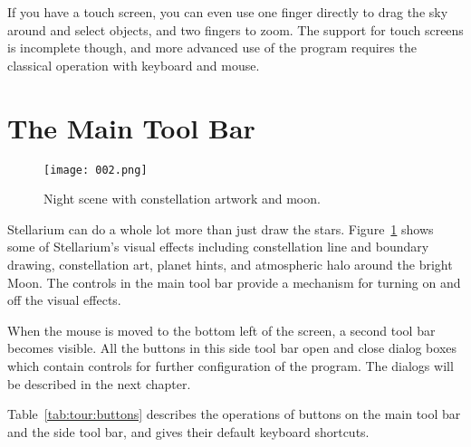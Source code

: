 If you have a touch screen, you can even use one finger directly to
drag the sky around and select objects, and two fingers to zoom. The
support for touch screens is incomplete though, and more advanced use
of the program requires the classical operation with keyboard and mouse.

\section{The Main Tool Bar}
\label{sec:tour:toolbar}

\begin{figure}[htb]
\centering\texttt{[image: 002.png]}
\caption{Night scene with constellation artwork and moon.}
\label{fig:002}
\end{figure}

Stellarium can do a whole lot more than just draw the stars. Figure~\ref{fig:002}
shows some of Stellarium's visual effects including constellation
line and boundary drawing, constellation art, planet hints, and
atmospheric halo around the bright Moon. The controls in the main tool bar
provide a mechanism for turning on and off the visual effects.

When the mouse is moved to the bottom left of the screen, a second
tool bar becomes visible. All the buttons in this side tool bar open
and close dialog boxes which contain controls for further
configuration of the program. The dialogs will be described in the
next chapter.


Table~\ref{tab:tour:buttons} describes the operations of buttons
on the main tool bar and the side tool bar, and gives their default
keyboard shortcuts.

